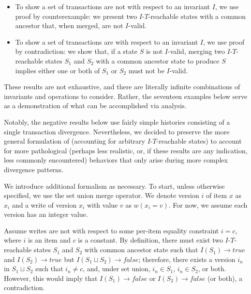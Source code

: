 \begin{itemize}

\item To show a set of transactions are not \iconfluent with respect to an invariant $I$, we use proof by counterexample: we present two $I$-$T$-reachable states with a common ancestor that, when merged, are not $I$-valid. 

\item To show a set of transactions are \iconfluent with respect to an
  invariant $I$, we use proof by contradiction: we show that, if a
  state $S$ is not $I$-valid, merging two $I$-$T$-reachable states
  $S_1$ and $S_2$ with a common ancestor state to produce $S$ implies
  either one or both of $S_1$ or $S_2$ must not be $I$-valid.

\end{itemize}

These results are not exhaustive, and there are literally infinite combinations of invariants and operations to consider. Rather, the seventeen examples below serve as a demonstration of what can be accomplished via \iconfluence analysis.

Notably, the negative results below use fairly simple histories
consisting of a single transaction divergence. Nevertheless, we
decided to preserve the more general formulation of \iconfluence
(accounting for arbitrary $I$-$T$-reachable states) to account for
more pathological (perhaps less realistic, or, if these results are
any indication, less commonly encountered) behaviors that only arise
during more complex divergence patterns.

We introduce additional formalism as necessary. To start, unless
otherwise specified, we use the set union merge operator. We denote
version $i$ of item $x$ as $x_i$ and a write of version $x_i$ with
value $v$ as $w(x_i=v)$. For now, we assume each version has an
integer value.

\begin{claim}
\label{claim:eq-proof}
Assume writes are not \iconfluent with respect to some per-item equality constraint $i=c$, where $i$ is an item and $c$ is a constant. By definition, there must exist two $I$-$T$-reachable states $S_1$ and $S_2$ with common ancestor state such that $I(S_1) \rightarrow true$ and $I(S_2) \rightarrow true$ but $I(S_1 \sqcup S_2) \rightarrow false$; therefore, there exists a version $i_n$ in $S_1 \sqcup S_2$ such that $i_n \neq c$, and, under set union, $i_n \in S_1$, $i_n \in S_2$, or both. However, this would imply that $I(S_1) \rightarrow false$ or $I(S_2) \rightarrow false$ (or both), a contradiction.
\end{claim} 

